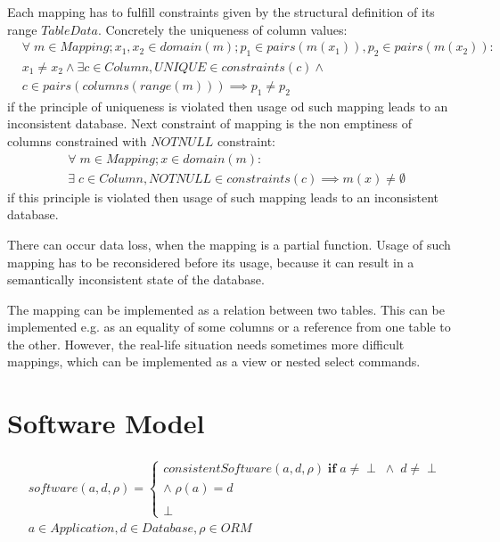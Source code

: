 \documentclass[10pt]{article}
\begin{document}
Each mapping has to fulfill constraints given by the structural definition of its range $TableData$. Concretely the uniqueness of column values:
\begin{align}
& \forall \; m \in Mapping;  x_1, x_2 \in domain(m); p_1 \in pairs(m(x_1)),  p_2 \in pairs(m(x_2)): \nonumber \\ 
&  x_1 \neq x_2 \land \exists c \in Column, UNIQUE \in constraints(c) \land \nonumber \\ 
&c \in pairs(columns(range(m))) \implies  p_1 \neq p_2
\end{align}
if the principle of uniqueness is violated then usage od such mapping leads to an inconsistent database. Next constraint of mapping is the non emptiness of columns constrained with $NOTNULL$ constraint:
\begin{align}
& \forall \; m \in Mapping;  x \in domain(m) :  \nonumber \\
& \exists \; c \in Column, NOTNULL \in constraints(c) \implies m(x) \neq \emptyset
\end{align}
if this principle is violated then usage of such mapping leads to an inconsistent database. 

There can occur data loss, when the mapping is a partial function. Usage of such mapping has to be reconsidered before its usage, because it can result in a semantically inconsistent state of the database. 

The mapping can be implemented as a relation between two tables. This can be implemented e.g. as an equality of some columns or a reference from one table to the other. However, the real-life situation needs sometimes more difficult mappings, which can be implemented as a view or nested select commands. %



\section{Software Model}
\begin{align}
& software(a, d, \rho) = \begin{cases}
consistentSoftware(a, d, \rho) \; \textbf{if} \; a \neq \perp \; \wedge \; d \neq \perp \\ \wedge \; \rho(a) = d 
 \\\\
 \perp
 \end{cases}\\
& a \in Application, d \in Database, \rho \in ORM \nonumber
\end{align}
\end{document}
